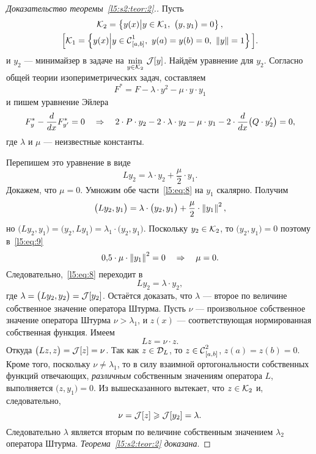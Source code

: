 \begin{proof}[Доказательство теоремы~\ref{l5:s2:teor:2}.] Пусть 
	\begin{multline*}
		\K_2=\left\{y(x)\middle|y\in\K_1,\ \big(y,y_1\big)=0\right\},\\\Big[\K_1=\left\{y(x)\middle|y\in\Cfn[{[a,b]}]{1},\ y(a)=y(b)=0,\ \norm{y}=1\right\}\Big].
	\end{multline*} 
	и $y_2$ --- минимайзер в задаче на $\min\limits_{y\in\K_2}\,\J[y]$. Найдём уравнение для $y_2$. Согласно общей теории изопериметрических задач, составляем 
	\begin{equation*}
		 F^{\ast}=F-\lambda\cdot y^2-\mu\cdot y\cdot y_1
	\end{equation*}
	и пишем уравнение Эйлера 
	\begin{equation*}
		 F^{\ast}_y-\der{}{x}F^{\ast}_{y'}=0\quad\Rightarrow\quad 2\cdot P\cdot y_2-2\cdot\lambda\cdot y_2-\mu\cdot y_1-2\cdot\der{}{x}\big(Q\cdot y'_2\big)=0,
	\end{equation*}
	где $\lambda$ и $\mu$ --- неизвестные константы. 
	
	Перепишем это уравнение в виде
	\begin{equation}
		\label{l5:eq:8}
		 Ly_2=\lambda\cdot y_2+\frac{\mu}2\cdot y_1.
	\end{equation}
	Докажем, что $\mu=0$. Умножим обе части~\eqref{l5:eq:8} на $y_1$ скалярно. Получим
	\begin{equation}
		\label{l5:eq:9}
		\big(Ly_2,y_1\big)=\lambda\cdot\big(y_2,y_1\big)+\frac{\mu}{2}\cdot \norm{y_1}^2,
	\end{equation} 
	но $\big(Ly_2,y_1\big)=\big(y_2,Ly_1\big)=\lambda_1\cdot\big(y_2,y_1\big)$. Поскольку $y_2\in\K_2$, то $\big(y_2,y_1\big)=0$ поэтому в~\eqref{l5:eq:9}
	\begin{equation*}
		 0{,}5\cdot\mu\cdot\norm{y_1}^2=0\quad\Rightarrow\quad\mu=0.
	\end{equation*}
	Следовательно{\mb,}~\eqref{l5:eq:8} переходит в 
	\begin{equation*}
		 Ly_2=\lambda\cdot y_2,
	\end{equation*}
	где $\lambda=\big(Ly_2,y_2\big)=\J[y_2]$. Остаётся доказать, что $\lambda$ --- второе по величине собственное значение оператора Штурма. Пусть $\nu$ --- произвольное собственное значение оператора Штурма $\nu>\lambda_1$, и $z(x)$ --- соответствующая нормированная собственная функция. Имеем 
	\begin{equation*}
		 Lz=\nu\cdot z.
	\end{equation*}
	Откуда $\big(Lz,z\big)=\J[z]=\nu$. Так как $z\in\mc{D}_{L}$, то $z\in\Cfn[{[a,b]}]{2}$, $z(a)=z(b)=0$. Кроме того, поскольку $\nu\neq\lambda_1$, то в силу взаимной ортогональности собственных функций отвечающих, \emph{различным} собственным значениям оператора $L$, выполняется $\big(z,y_1\big)=0$. Из вышесказанного вытекает, что $z\in\K_2$ и, следовательно,
	\begin{equation*}
		\nu=\J[z]\geqslant\J[y_2]=\lambda.
	\end{equation*} 
	Следовательно $\lambda$ является вторым по величине собственным значением $\lambda_2$ оператора Штурма. \emph{Теорема~\ref{l5:s2:teor:2} доказана}. 
\end{proof}
